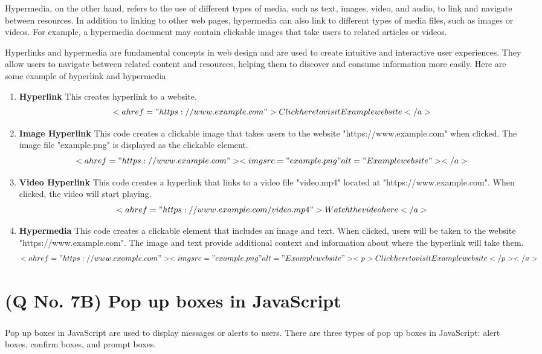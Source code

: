 \documentclass[11pt]{article}
\begin{document}
Hypermedia, on the other hand, refers to the use of different types of media, such as text, images, video, and audio, to link and navigate between resources. In addition to linking to other web pages, hypermedia can also link to different types of media files, such as images or videos. For example, a hypermedia document may contain clickable images that take users to related articles or videos.

Hyperlinks and hypermedia are fundamental concepts in web design and are used to create intuitive and interactive user experiences. They allow users to navigate between related content and resources, helping them to discover and consume information more easily.
Here are some example of hyperlink and hypermedia
\begin{enumerate}
    \item \textbf{Hyperlink} This creates hyperlink to a website.
    \[ <a href="https://www.example.com">Click here to visit Example website</a>
\] 
    \item \textbf{Image Hyperlink} This code creates a clickable image that takes users to the website "https://www.example.com" when clicked. The image file "example.png" is displayed as the clickable element.
    \[ <a href="https://www.example.com"><img src="example.png" alt="Example website"></a>
\]
    \item \textbf{Video Hyperlink} This code creates a hyperlink that links to a video file "video.mp4" located at "https://www.example.com". When clicked, the video will start playing.
     \[ <a href="https://www.example.com/video.mp4">Watch the video here</a>
\]
    \item \textbf{Hypermedia} This code creates a clickable element that includes an image and text. When clicked, users will be taken to the website "https://www.example.com". The image and text provide additional context and information about where the hyperlink will take them.
    \[ <a href="https://www.example.com">
    <img src="example.png" alt="Example website">
    <p>Click here to visit Example website</p>
  </a>
\]  
\end{enumerate}
\section{(Q No. 7B) Pop up boxes in JavaScript}
\subparagraph{}
Pop up boxes in JavaScript are used to display messages or alerts to users. There are three types of pop up boxes in JavaScript: alert boxes, confirm boxes, and prompt boxes.
\end{document}

